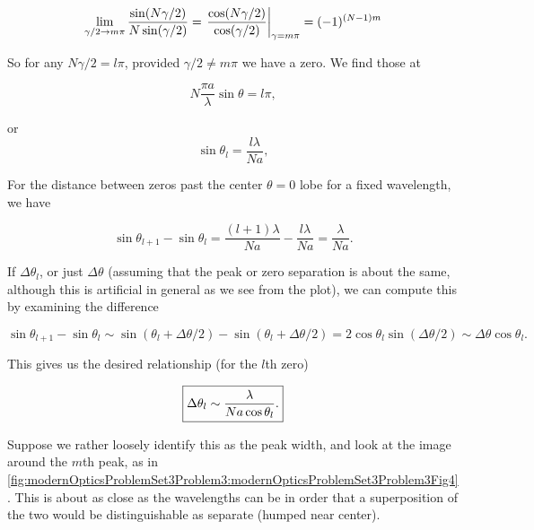 {\begin{dmath}\label{eqn:modernOptics:problemSet3:3:360}
\lim_{\gamma/2 \rightarrow m \pi}
\frac{\sin( N \gamma / 2 )}
{N \sin( \gamma/2) }
=
\evalbar{\frac{\cos( N \gamma / 2 )}
{\cos( \gamma/2) }}{\gamma = m \pi}
= (-1)^{(N -1) m}
\end{dmath}

So for any $N \gamma/2 = l \pi$, provided $\gamma/2 \ne m \pi$ we have a zero.  We find those at

\begin{dmath}\label{eqn:modernOptics:problemSet3:3:380}
N \frac{\pi a}{\lambda} \sin\theta = l \pi,
\end{dmath}

or
\begin{dmath}\label{eqn:modernOptics:problemSet3:3:400}
\sin\theta_l = \frac{l \lambda}{N a},
\end{dmath}

For the distance between zeros past the center $\theta = 0$ lobe for a fixed wavelength, we have

\begin{dmath}\label{eqn:modernOptics:problemSet3:3:420}
\sin\theta_{l+1} - \sin\theta_l =
\frac{(l+1) \lambda}{N a}
-
\frac{l \lambda}{N a}
=
\frac{\lambda}{N a}.
\end{dmath}

If $\Delta \theta_l$, or just $\Delta \theta$ (assuming that the peak or zero separation is about the same, although this is artificial in general as we see from the plot), we can compute this by examining the difference

\begin{dmath}\label{eqn:modernOptics:problemSet3:3:440}
\sin\theta_{l+1} - \sin\theta_l
\sim
\sin(\theta_l + \Delta \theta/2)
-\sin(\theta_l + \Delta \theta/2)
= 2 \cos \theta_l \sin (\Delta \theta/2)
\sim \Delta \theta \cos\theta_l.
\end{dmath}

This gives us the desired relationship (for the $l$th zero)

\begin{dmath}\label{eqn:modernOptics:problemSet3:3:460}
\myBoxed{
\Delta \theta_l \sim \frac{\lambda}{N a \cos\theta_l}.
}
\end{dmath}

Suppose we rather loosely identify this as the peak width, and look at the image around the $m$th peak, as in \cref{fig:modernOpticsProblemSet3Problem3:modernOpticsProblemSet3Problem3Fig4}.  This is about as close as the wavelengths can be in order that a superposition of the two would be distinguishable as separate (humped near center).

}
